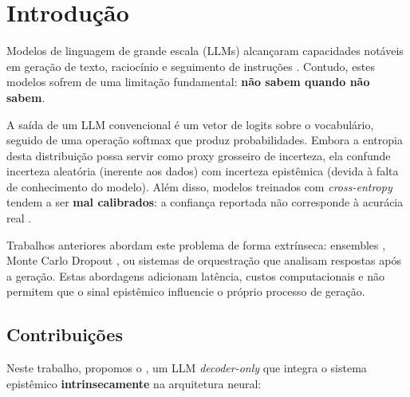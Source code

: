 
\section{Introdu\c{c}\~ao}
\label{sec:introducao}

Modelos de linguagem de grande escala (LLMs) alcan\c{c}aram capacidades
not\'aveis em gera\c{c}\~ao de texto, racioc\'inio e seguimento de instru\c{c}\~oes
\cite{brown2020gpt3, touvron2023llama}. Contudo, estes modelos sofrem de uma
limita\c{c}\~ao fundamental: \textbf{n\~ao sabem quando n\~ao sabem}.

A sa\'ida de um LLM convencional \'e um vetor de logits sobre o vocabul\'ario,
seguido de uma opera\c{c}\~ao softmax que produz probabilidades. Embora a entropia
desta distribui\c{c}\~ao possa servir como proxy grosseiro de incerteza, ela
confunde incerteza aleat\'oria (inerente aos dados) com incerteza epist\^emica
(devida \`a falta de conhecimento do modelo). Al\'em disso, modelos treinados com
\textit{cross-entropy} tendem a ser \textbf{mal calibrados}: a confian\c{c}a
reportada n\~ao corresponde \`a acur\'acia real \cite{guo2017calibration}.

Trabalhos anteriores abordam este problema de forma extr\'inseca:
ensembles \cite{lakshminarayanan2017simple}, Monte Carlo Dropout
\cite{gal2016dropout}, ou sistemas de orquestra\c{c}\~ao que analisam respostas
ap\'os a gera\c{c}\~ao. Estas abordagens adicionam lat\^encia, custos computacionais
e n\~ao permitem que o sinal epist\^emico influencie o pr\'oprio processo de
gera\c{c}\~ao.

\subsection{Contribui\c{c}\~oes}

Neste trabalho, propomos o \aletheion{}, um LLM \textit{decoder-only} que integra
o sistema epist\^emico \textbf{intrinsecamente} na arquitetura neural:

